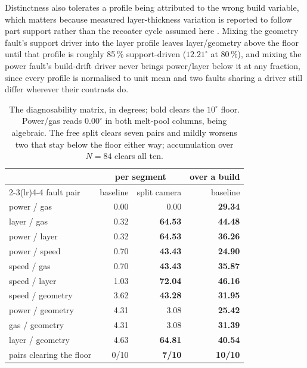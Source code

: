 \documentclass[final,5p,times,twocolumn]{elsarticle}
\begin{document}
Distinctness also tolerates a profile being attributed to the wrong build
variable, which matters because measured layer-thickness variation is reported
to follow part support rather than the recoater cycle assumed here
\cite{Liu2022}. Mixing the geometry fault's support driver into the layer
profile leaves layer/geometry above the floor until that profile is roughly
85\,\% support-driven ($12.21^\circ$ at 80\,\%), and mixing the power fault's
build-drift driver never brings power/layer below it at any fraction, since
every profile is normalised to unit mean and two faults sharing a driver still
differ wherever their contrasts do.

\begin{table}[htbp]
\centering
\caption{The diagnosability matrix, in degrees; bold clears the $10^\circ$ floor.
Power/gas reads $0.00^\circ$ in both melt-pool columns, being algebraic. The free
split clears seven pairs and mildly worsens two that stay below the floor either
way; accumulation over $N=84$ clears all ten.}
\label{tab:matrix}
\scriptsize
\begin{tabular}{@{}lrrr@{}}
\toprule
 & \multicolumn{2}{c}{per segment} & over a build \\
\cmidrule(lr){2-3}\cmidrule(lr){4-4}
fault pair & baseline & split camera & baseline \\
\midrule
power / gas      & 0.00 & 0.00 & \textbf{29.34} \\
layer / gas      & 0.32 & \textbf{64.53} & \textbf{44.48} \\
power / layer    & 0.32 & \textbf{64.53} & \textbf{36.26} \\
power / speed    & 0.70 & \textbf{43.43} & \textbf{24.90} \\
speed / gas      & 0.70 & \textbf{43.43} & \textbf{35.87} \\
speed / layer    & 1.03 & \textbf{72.04} & \textbf{46.16} \\
speed / geometry & 3.62 & \textbf{43.28} & \textbf{31.95} \\
power / geometry & 4.31 & 3.08 & \textbf{25.42} \\
gas / geometry   & 4.31 & 3.08 & \textbf{31.39} \\
layer / geometry & 4.63 & \textbf{64.81} & \textbf{40.54} \\
\midrule
pairs clearing the floor & 0/10 & \textbf{7/10} & \textbf{10/10} \\
\bottomrule
\end{tabular}
\end{table}
\end{document}
